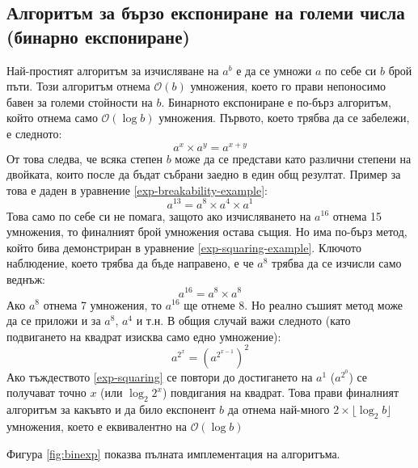   \subsection{Алгоритъм за бързо експониране на големи числа (бинарно експониране)} \label{binexp}
  Най-простият алгоритъм за изчисляване на $a^b$ е да се умножи $a$ по себе си $b$ брой пъти. Този алгоритъм отнема $\mathcal{O}(b)$ умножения, което го прави непоносимо бавен за големи стойности на $b$. Бинарното експониране е по-бърз алгоритъм, който отнема само $\mathcal{O}(\log b)$ умножения.
  Първото, което трябва да се забележи, е следното:
  \begin{equation}
    a^x \times a^y = a^{x + y}
    \label{exp-breakability}
  \end{equation}
  От това следва, че всяка степен $b$ може да се представи като различни степени на двойката, които после да бъдат събрани заедно в един общ резултат. Пример за това е даден в уравнение \ref{exp-breakability-example}:
  \begin{equation}
    a^{13} = a^8 \times a^4 \times a^1
    \label{exp-breakability-example}
  \end{equation}
  Това само по себе си не помага, защото ако изчисляването на $a^{16}$ отнема 15 умножения, то финалният брой умножения остава същия. Но има по-бърз метод, който бива демонстриран в уравнение \ref{exp-squaring-example}. Ключото наблюдение, което трябва да бъде направено, е че $a^8$ трябва да се изчисли само веднъж:
  \begin{equation}
    a^{16} = a^8 \times a^8
    \label{exp-squaring-example}
  \end{equation}
  Ако $a^8$ отнема 7 умножения, то $a^{16}$ ще отнеме 8. Но реално съшият метод може да се приложи и за $a^8$, $a^4$ и т.н. В общия случай важи следното (като подвигането на квадрат изисква само едно умножение):
  \begin{equation}
    a^{2^x} = (a^{2^{x-1}})^2
    \label{exp-squaring}
  \end{equation}
Ако тъждеството \ref{exp-squaring} се повтори до достигането на $a^1$ ($a^{2^0}$) се получават точно $x$ (или $\log_2 2^x$) повдигания на квадрат. Това прави финалният алгоритъм за какъвто и да било експонент $b$ да отнема най-много $2 \times \lfloor \log_2 b \rfloor$ умножения, което е еквивалентно на $\mathcal{O}(\log b)$

  Фигура \ref{fig:binexp} показва пълната имплементация на алгоритъма.


